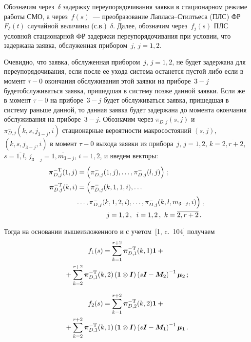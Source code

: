 \begin{multicols}{2}
Обозначим через~$\delta$ задержку переупорядочивания заявки в стационарном режиме работы СМО, а через~$f(s)$~--- 
преобразование Лапласа--Стилтьеса (ПЛС) ФР~$F_{\delta}(t)$ случайной величины (с.в.)~$\delta$. Далее, обозначим 
через~$f_j(s)$ ПЛС условной стационарной ФР задержки переупорядочивания при условии, что задержана заявка, 
обслуженная прибором~$j$, $j=1,2$.

Очевидно, что заявка, обслуженная прибором~$j$, $j=1,2$, не будет задержана для переупорядочивания, 
если после ее ухода система останется пус\-той либо если в момент $\tau -0$ окончания 
обслуживания этой заявки на приборе~$3-j$ будет\linebreak обслуживаться заявка, пришедшая в систему позже данной заявки. 
Если же в момент $\tau -0$ на приборе~$3-j$ будет обслуживаться заявка, пришедшая в систему  раньше данной, 
то данная заявка будет задержана до момента окончания обслуживания на приборе~$3-j$. Обозначим через 
$\pi_{D,j}^{-}(s,j)$ и $\pi_{D,j}^{-}(k,s,j_{3-j},i)$ стационарные вероятности макросостояний $(s,j)$, 
$(k,s,j_{3-j},i)$ в момент $\tau -0$ выхода заявки из прибора~$j$, $j=1,2$, $k=\overline{2,r+2}$, 
$s=\overline{1,l}$, $j_{3-j}=\overline{1,m_{3-j}}$, $i=1,2$, и введем векторы:
\begin{align*}
\boldsymbol{\pi}_{D,j}^{-\mathrm{T}}(1,j)&=\left(\pi_{D,j}^{-}(1,j),\ldots, \pi_{D,j}^{-}(l,j)\right)\,;
\\
\boldsymbol{\pi}_{D,j}^{-\mathrm{T}}(k,i)&=\left(\pi_{D,j}^{-}(k,1,1,i),\ldots \right.\\
&\!\!\left.\ldots,\pi_{D,j}^{-}(k,1,2,i),\ldots, \pi_{D,j}^{-}(k,l,m_{3-j},i)\right)\,,\\
&\hspace*{15mm}j=1,2\,,\enskip  i=1,2\,,\,\, k=\overline{2,r+2}\,.
\end{align*}

Тогда на основании вышеизложенного и с учетом~[1, c.~104] получаем
\begin{multline}
\label{eq:16}
f_1(s)=\sum\limits_{k=1}^{r+2}\boldsymbol{\pi}_{D,1}^{-\mathrm{T}}(k,1) \boldsymbol{1}+{}\\
{}
+\sum\limits_{k=2}^{r+2}\boldsymbol{\pi}_{D,1}^{-\mathrm{T}}(k,2)
\left({\bf{1}}\otimes\boldsymbol{I}\right)
\left(s\boldsymbol{I}-\boldsymbol{M}_2\right)^{-1}\boldsymbol{\mu}_2\,;
\end{multline}

\vspace*{-6pt}

\noindent
\begin{multline}
\label{eq:17}
f_2(s)=\sum\limits_{k=1}^{r+2}\boldsymbol{\pi}_{D,2}^{-\mathrm{T}}(k,2) \boldsymbol{1}+{}\\
{}+\sum\limits_{k=2}^{r+2}\boldsymbol{\pi}_{D,1}^{-\mathrm{T}}(k,1)
\left({\bf{1}}\otimes\boldsymbol{I}\right)
\left(s\boldsymbol{I}-\boldsymbol{M}_1\right)^{-1}\boldsymbol{\mu}_1\,.
\end{multline}


\end{multicols}
